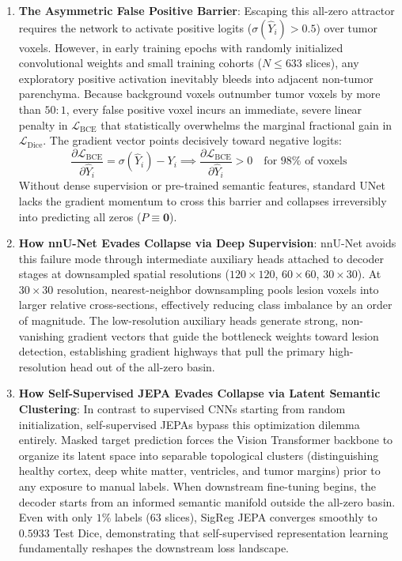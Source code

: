 \documentclass{article}
\begin{document}
\begin{enumerate}
    \item \textbf{The Asymmetric False Positive Barrier}: Escaping this all-zero attractor requires the network to activate positive logits ($\sigma(\hat{Y}_i) > 0.5$) over tumor voxels. However, in early training epochs with randomly initialized convolutional weights and small training cohorts ($N \le 633$ slices), any exploratory positive activation inevitably bleeds into adjacent non-tumor parenchyma. Because background voxels outnumber tumor voxels by more than $50:1$, every false positive voxel incurs an immediate, severe linear penalty in $\mathcal{L}_{\text{BCE}}$ that statistically overwhelms the marginal fractional gain in $\mathcal{L}_{\text{Dice}}$. The gradient vector points decisively toward negative logits:
    \begin{equation}
        \frac{\partial \mathcal{L}_{\text{BCE}}}{\partial \hat{Y}_i} = \sigma(\hat{Y}_i) - Y_i \implies \frac{\partial \mathcal{L}_{\text{BCE}}}{\partial \hat{Y}_i} > 0 \quad \text{for } 98\% \text{ of voxels}
    \end{equation}
    Without dense supervision or pre-trained semantic features, standard UNet lacks the gradient momentum to cross this barrier and collapses irreversibly into predicting all zeros ($P \equiv \mathbf{0}$).
    
    \item \textbf{How nnU-Net Evades Collapse via Deep Supervision}: nnU-Net avoids this failure mode through intermediate auxiliary heads attached to decoder stages at downsampled spatial resolutions ($120\times 120$, $60\times 60$, $30\times 30$). At $30 \times 30$ resolution, nearest-neighbor downsampling pools lesion voxels into larger relative cross-sections, effectively reducing class imbalance by an order of magnitude. The low-resolution auxiliary heads generate strong, non-vanishing gradient vectors that guide the bottleneck weights toward lesion detection, establishing gradient highways that pull the primary high-resolution head out of the all-zero basin.
    
    \item \textbf{How Self-Supervised JEPA Evades Collapse via Latent Semantic Clustering}: In contrast to supervised CNNs starting from random initialization, self-supervised JEPAs bypass this optimization dilemma entirely. Masked target prediction forces the Vision Transformer backbone to organize its latent space into separable topological clusters (distinguishing healthy cortex, deep white matter, ventricles, and tumor margins) prior to any exposure to manual labels. When downstream fine-tuning begins, the decoder starts from an informed semantic manifold outside the all-zero basin. Even with only $1\%$ labels ($63$ slices), SigReg JEPA converges smoothly to $0.5933$ Test Dice, demonstrating that self-supervised representation learning fundamentally reshapes the downstream loss landscape.
\end{enumerate}
\end{document}
